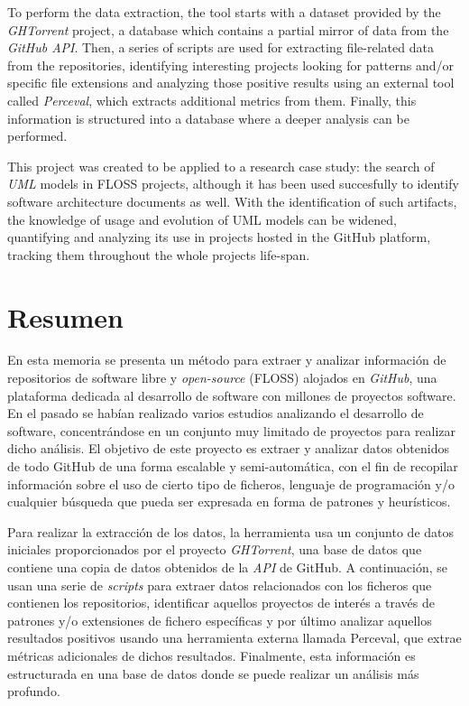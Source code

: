 \documentclass[a4paper, 12pt]{book}
\begin{document}
To perform the data extraction, the tool starts with a dataset provided by the \emph{GHTorrent} project,
a database which contains a partial mirror of data from the \emph{GitHub API}. Then, a series of scripts are
used for extracting file-related data from the repositories, identifying interesting projects looking for patterns and/or
specific file extensions and analyzing those positive results using an external tool called \emph{Perceval},
which extracts additional metrics from them. Finally, this information is structured into a database where a deeper
analysis can be performed.

This project was created to be applied to a research case study: the search of \emph{UML} models in FLOSS projects, although it has been used succesfully to identify software architecture documents as well.
With the identification of such artifacts, the knowledge of usage and evolution of UML models can be widened,
quantifying and analyzing its use in projects hosted in the GitHub platform, tracking them throughout
the whole projects life-span.
\chapter*{Resumen}
En esta memoria se presenta un método para extraer y analizar información de repositorios de software libre y \textit{open-source}
(FLOSS) alojados en \emph{GitHub}, una plataforma dedicada al desarrollo de software con millones de proyectos software. En el pasado se habían realizado varios estudios
analizando el desarrollo de software, concentrándose en un conjunto muy limitado de proyectos para realizar
dicho análisis. El objetivo de este proyecto es extraer y analizar datos obtenidos de todo GitHub de una forma escalable
y semi-automática, con el fin de recopilar información sobre el uso de cierto tipo de ficheros, lenguaje de programación
y/o cualquier búsqueda que pueda ser expresada en forma de patrones y heurísticos.

Para realizar la extracción de los datos, la herramienta usa un conjunto de datos iniciales proporcionados por el proyecto
\emph{GHTorrent}, una base de datos que contiene una copia de datos obtenidos de la \emph{API} de GitHub.
A continuación, se usan una serie de \textit{scripts} para extraer datos relacionados con los ficheros que contienen los
repositorios, identificar aquellos proyectos de interés a través de patrones y/o extensiones de fichero específicas y
por último analizar aquellos resultados positivos usando una herramienta externa llamada Perceval, que extrae métricas
adicionales de dichos resultados. Finalmente, esta información es estructurada en una base de datos donde se puede
realizar un análisis más profundo.
\end{document}
